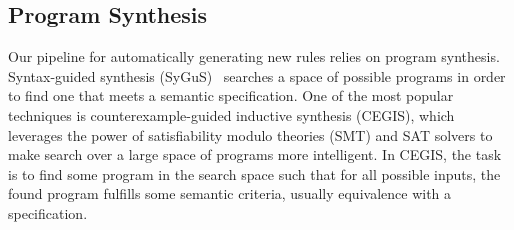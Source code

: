 \documentclass[acmsmall,review,anonymous]{acmart}\settopmatter{printfolios=true,printccs=false,printacmref=false}
\begin{document}





\subsection{Program Synthesis}
Our pipeline for automatically generating new rules relies on program synthesis.
Syntax-guided synthesis (SyGuS)~\cite{sygus} searches a space of possible programs in order to find one that meets
a semantic specification.  One of the most popular techniques is counterexample-guided
inductive synthesis (CEGIS), which leverages the power of satisfiability modulo theories
(SMT) and SAT solvers to make search over a large space of programs more intelligent.
In CEGIS, the task is to find some program in the search space such that for all possible
inputs, the found program fulfills some semantic criteria, usually equivalence with
a specification.
\end{document}
